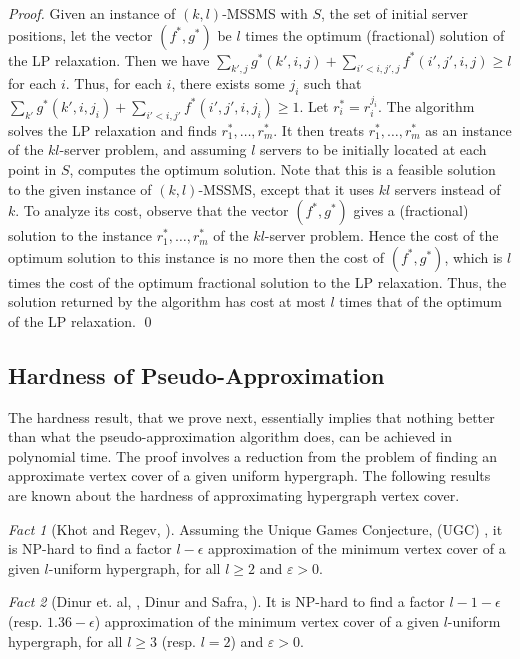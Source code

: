 \documentclass[11pt]{article}
\theoremstyle{plain}\newtheorem{theorem}{Theorem}
\theoremstyle{definition}
\theoremstyle{remark}
\newtheorem{fact}{Fact}
\begin{document}
\begin{proof}
Given an instance of $(k,l)$-MSSMS with $S$, the set of initial server positions, let 
the vector $(f^*,g^*)$ be $l$ times the optimum (fractional) solution of the LP relaxation. Then we have $\sum_{k',j}g^*(k',i,j)+\sum_{i'<i,j',j}f^*(i',j',i,j)\geq l$ for each $i$.
Thus, for each $i$, there exists some $j_i$ such that $\sum_{k'}g^*(k',i,j_i)+\sum_{i'<i,j'}f^*(i',j',i,j_i)\geq1$. Let $r^*_i=r_i^{j_i}$. The algorithm solves the LP relaxation and finds $r^*_1,\ldots,r^*_m$. It then treats $r^*_1,\ldots,r^*_m$ as an instance of the $kl$-server problem, and assuming $l$ servers to be initially located at each point in $S$, computes the optimum solution. Note that this is a feasible solution to the given instance of $(k,l)$-MSSMS, except that it uses $kl$ servers instead of $k$. To analyze its cost, observe that the vector $(f^*,g^*)$ gives a (fractional) solution to the instance $r^*_1,\ldots,r^*_m$ of the $kl$-server problem. Hence the cost of the optimum solution to this instance is no more then the cost of $(f^*,g^*)$, which is $l$ times the cost of the optimum fractional solution to the LP relaxation. 
Thus, the solution returned by the algorithm 
has cost at most $l$ times that of the optimum of the LP relaxation. \qed
\end{proof}

\subsection{Hardness of Pseudo-Approximation}

The hardness result, that we prove next, essentially implies that nothing better than what the pseudo-approximation algorithm does, can be achieved in polynomial time. The proof involves a reduction from the problem of finding an approximate vertex cover of a given uniform hypergraph. The following results are known about the hardness of approximating hypergraph vertex cover.

\begin{fact}[Khot and Regev, \cite{KhotR08}]\label{fact_hard1}
Assuming the Unique Games Conjecture, (UGC) \cite{Khot_STOC02_UGC}, it is NP-hard to find a factor $l-\epsilon$ approximation of the minimum vertex cover of a given $l$-uniform hypergraph, for all $l\geq2$ and $\varepsilon>0$.
\end{fact}

\begin{fact}[Dinur et. al, \cite{DinurGKR05_VC_hardness}, Dinur and Safra, \cite{DinurS_STOC02_VC_hardness}]\label{fact_hard2}
It is NP-hard to find a factor $l-1-\epsilon$ (resp. $1.36-\epsilon$) approximation of the minimum vertex cover of a given $l$-uniform hypergraph, for all $l\geq3$ (resp. $l=2$) and $\varepsilon>0$.
\end{fact}
\end{document}
